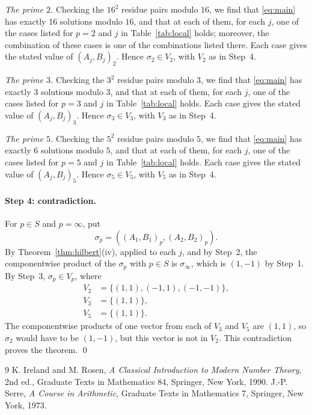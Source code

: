 \documentclass[11pt]{article}
\begin{document}
\emph{The prime $2$.} Checking the $16^2$ residue pairs modulo $16$, we find that \eqref{eq:main} has exactly 16 solutions modulo $16$, and that at each of them, for each $j$, one of the cases listed for $p=2$ and $j$ in Table~\ref{tab:local} holds; moreover, the combination of these cases is one of the combinations listed there. Each case gives the stated value of $(A_j,B_j)_{2}$. Hence $\sigma_{2}\in V_{2}$, with $V_{2}$ as in Step~4.

\emph{The prime $3$.} Checking the $3^2$ residue pairs modulo $3$, we find that \eqref{eq:main} has exactly 3 solutions modulo $3$, and that at each of them, for each $j$, one of the cases listed for $p=3$ and $j$ in Table~\ref{tab:local} holds. Each case gives the stated value of $(A_j,B_j)_{3}$. Hence $\sigma_{3}\in V_{3}$, with $V_{3}$ as in Step~4.

\emph{The prime $5$.} Checking the $5^2$ residue pairs modulo $5$, we find that \eqref{eq:main} has exactly 6 solutions modulo $5$, and that at each of them, for each $j$, one of the cases listed for $p=5$ and $j$ in Table~\ref{tab:local} holds. Each case gives the stated value of $(A_j,B_j)_{5}$. Hence $\sigma_{5}\in V_{5}$, with $V_{5}$ as in Step~4.

\paragraph{Step 4: contradiction.} For $p\in S$ and $p=\infty$, put \[\sigma_p=((A_{1},B_{1})_p,(A_{2},B_{2})_p).\] By Theorem~\ref{thm:hilbert}(iv), applied to each $j$, and by Step~2, the componentwise product of the $\sigma_p$ with $p\in S$ is $\sigma_\infty$, which is $(1,-1)$ by Step~1. By Step~3, $\sigma_p\in V_p$, where
\begin{align*}
V_{2}&=\{(1,1),(-1,1),(-1,-1)\},\\
V_{3}&=\{(1,1)\},\\
V_{5}&=\{(1,1)\}.
\end{align*}The componentwise products of one vector from each of $V_{3}$ and $V_{5}$ are $(1,1)$, so $\sigma_{2}$ would have to be $(1,-1)$, but this vector is not in $V_{2}$. This contradiction proves the theorem.
\qed

\begin{thebibliography}{9}
 K. Ireland and M. Rosen, \emph{A Classical Introduction to Modern Number Theory}, 2nd ed., Graduate Texts in Mathematics 84, Springer, New York, 1990.
 J.-P. Serre, \emph{A Course in Arithmetic}, Graduate Texts in Mathematics 7, Springer, New York, 1973.
\end{thebibliography}
\end{document}
